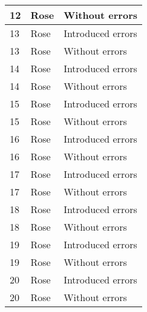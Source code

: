 \begin{table}[!ht]
\begin{center}
\begin{tabular}[center]{| l | l | l |}
         12 & Rose & Without errors \\
         \hline
         13 & Rose & Introduced errors \\
         13 & Rose & Without errors \\
         \hline
         14 & Rose & Introduced errors \\
         14 & Rose & Without errors \\
         \hline
         15 & Rose & Introduced errors \\
         15 & Rose & Without errors \\
         \hline
         16 & Rose & Introduced errors \\
         16 & Rose & Without errors \\
         \hline
         17 & Rose & Introduced errors \\
         17 & Rose & Without errors \\
         \hline
         18 & Rose & Introduced errors \\
         18 & Rose & Without errors \\
         \hline
         19 & Rose & Introduced errors \\
         19 & Rose & Without errors \\
         \hline
         20 & Rose & Introduced errors \\
         20 & Rose & Without errors \\
         \hline
      \end{tabular}
   \end{center}
\end{table}



